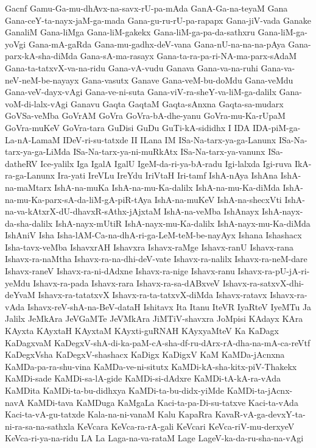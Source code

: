 {Gacnf
Gamu-Ga-mu-dhAvx-na-savx-rU-pa-mAda
GanA-Ga-na-teyaM
Gana
Gana-ceY-ta-nayx-jaM-ga-mada
Gana-gu-ru-rU-pa-rapapx
Gana-jiV-vada
Ganake
GanaliM
Gana-liMga
Gana-liM-gakekx
Gana-liM-ga-pa-da-sathxru
Gana-liM-ga-yoVgi
Gana-mA-gaRda
Gana-mu-gadhx-deV-vana
Gana-nU-na-na-na-pAya
Gana-parx-kA-sha-diMda
Gana-sA-ma-rasayx
Gana-ta-ra-pa-ri-NA-ma-parx-sAdaM
Gana-ta-tatxvX-va-na-ridu
Gana-vA-vudu
Ganava
Gana-va-na-ruhi
Gana-va-neV-neM-be-nayayx
Gana-vasutx
Ganave
Gana-veM-bu-doMdu
Gana-veMdu
Gana-veV-dayx-vAgi
Gana-ve-ni-suta
Gana-viV-ra-sheY-va-liM-ga-dalilx
Gana-voM-di-lalx-vAgi
Ganavu
Gaqta
GaqtaM
Gaqta-sAnxna
Gaqta-sa-mudarx
GoVSa-veMba
GoVrAM
GoVra
GoVra-bA-dhe-yanu
GoVra-mu-Ka-rUpaM
GoVra-muKeV
GoVra-tara
GuDisi
GuDu
GuTi-kA-sididhx
I
IDA
IDA-piM-ga-La-nA-LamaM
IDeV-ri-su-tatxde
II
ILana
IM
ISa-Na-tarx-ya-ga-Lanunx
ISa-Na-tarx-ya-ga-LiMda
ISa-Na-tarx-ya-ni-muRkAtx
ISa-Na-tarx-ya-vanunx
ISa-datheRV
Ice-yalilx
Iga
IgalA
IgalU
IgeM-da-ri-ya-bA-radu
Igi-lalxda
Igi-ruva
IkA-ra-ga-Lanunx
Ira-yati
IreVLu
IreYdu
IriVtaH
Iri-tamf
IshA-nAya
IshAna
IshA-na-maMtarx
IshA-na-muKa
IshA-na-mu-Ka-dalilx
IshA-na-mu-Ka-diMda
IshA-na-mu-Ka-parx-sA-da-liM-gA-piR-tAya
IshA-na-muKeV
IshA-na-shecxVti
IshA-na-va-kAtxrX-dU-dhavxR-sAthx-jAjxtaM
IshA-na-veMba
IshAnayx
IshA-nayx-da-sha-dalilx
IshA-nayx-mUtiR
IshA-nayx-mu-Ka-dalilx
IshA-nayx-mu-Ka-diMda
IshAniV
Isha
Isha-lAM-Ca-na-dhA-ri-ga-LeM-teM-be-nayAyx
Ishana
Ishashacx
Isha-tavx-veMba
IshavxrAH
Ishavxra
Ishavx-raMge
Ishavx-ranU
Ishavx-rana
Ishavx-ra-naMtha
Ishavx-ra-na-dhi-deV-vate
Ishavx-ra-nalilx
Ishavx-ra-neM-dare
Ishavx-raneV
Ishavx-ra-ni-dAdxne
Ishavx-ra-nige
Ishavx-ranu
Ishavx-ra-pU-jA-ri-yeMdu
Ishavx-ra-pada
Ishavx-rara
Ishavx-ra-sa-dABxveV
Ishavx-ra-satxvX-dhi-deYvaM
Ishavx-ra-tatatxvX
Ishavx-ra-ta-tatxvX-diMda
Ishavx-ratavx
Ishavx-ra-vAda
Ishavx-reV-shA-na-BeV-dataH
Ishitavx
Ita
Itanu
IteVR
IyaRteV
IyeMTu
Ja
Jalilx
JeMkAra
JeVGaMTe
JeVMkAra
JiMTiV-shavxra
JoMpisi
KAdayx
KAra
KAyxta
KAyxtaH
KAyxtaM
KAyxti-guRNAH
KAyxyaMteV
Ka
KaDagx
KaDagxvaM
KaDegxV-shA-di-ka-paM-cA-sha-df-ru-dArx-rA-dha-na-mA-ca-reVtf
KaDegxVsha
KaDegxV-shashacx
KaDigx
KaDigxV
KaM
KaMDa-jAcnxna
KaMDa-pa-ra-shu-vina
KaMDa-ve-ni-situtx
KaMDi-kA-sha-kitx-piV-Thakekx
KaMDi-sade
KaMDi-sa-lA-gide
KaMDi-si-dAdxre
KaMDi-tA-kA-ra-vAda
KaMDita
KaMDi-ta-bu-didhxya
KaMDi-ta-bu-didx-yiMde
KaMDi-ta-jAcnx-navA
KaMDi-tava
KaMDuga
KaMgaLa
Kaci-ta-pa-Di-su-tatxve
Kaci-ta-vAda
Kaci-ta-vA-gu-tatxde
Kala-na-ni-vanaM
Kalu
KapaRra
KavaR-vA-ga-devxY-ta-ni-ra-sa-na-sathxla
KeVcara
KeVca-ra-rA-gali
KeVcari
KeVca-riV-mu-derxyeV
KeVca-ri-ya-na-ridu
LA
La
Laga-na-va-rataM
Lage
LageV-ka-da-ru-sha-na-vAgi
}
